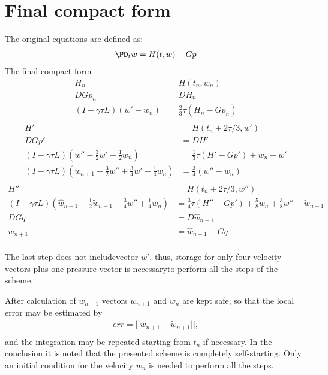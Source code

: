 \documentclass[11pt]{article}
\begin{document}
\section{Final compact form}
The original equations are defined as:
\begin{equation}\begin{aligned}
  \PD_t w = H(t,w) - G p \\
\end{aligned}\end{equation}
The final compact form
\begin{equation}\begin{aligned}
  H_n &= H(t_n,w_n) \\
  D G p_n &= D H_n \\
  (I - \gamma \tau L) (w' - w_n) &= \frac{2}{3} \tau (H_n - G p_n) \\
\end{aligned}\end{equation}
\begin{equation}\begin{aligned}
  H' &= H(t_n + 2 \tau/3,w') \\
  D G p' &= D H' \\
  (I - \gamma \tau L) (w'' - \frac{3}{2}w' + \frac{1}{2} w_n) &= \frac{1}{3} \tau (H' - G p') + w_n - w' \\
  (I - \gamma \tau L) (\tilde{w}_{n+1} - \frac{3}{2}w'' + \frac{3}{4} w' - \frac{1}{4}w_n) &= \frac{3}{4} (w'' - w_n) \\
\end{aligned}\end{equation}
\begin{equation}\begin{aligned}
  H'' &= H(t_n + 2 \tau/3,w'') \\
  (I - \gamma \tau L) (\hat{w}_{n+1} - \frac{1}{2} \tilde{w}_{n+1} - \frac{3}{4} w'' + \frac{1}{4} w_n) &= \frac{3}{4} \tau (H'' - G p') + \frac{5}{8} w_n + \frac{3}{8} w'' - \tilde{w}_{n+1} \\
  D G q &= D \hat{w}_{n+1} \\
  w_{n+1} &= \hat{w}_{n+1} - Gq \\
\end{aligned}\end{equation}

The last step does not includevector $w'$, thus, storage for only four velocity vectors plus one pressure vector is necessaryto perform all the steps of the scheme.

After calculation of $w_{n+1}$ vectors $\tilde{w}_{n+1}$ and $w_n$ are kept safe, so that the local error may be estimated by
\begin{equation}\begin{aligned}
 err = || w_{n+1} - \tilde{w}_{n+1} ||, \\
\end{aligned}\end{equation}
and the integration may be repeated starting from $t_n$ if necessary. In the conclusion it is noted that the presented scheme is completely self-starting. Only an initial condition for the velocity $w_n$ is needed to perform all the steps.
\end{document}
